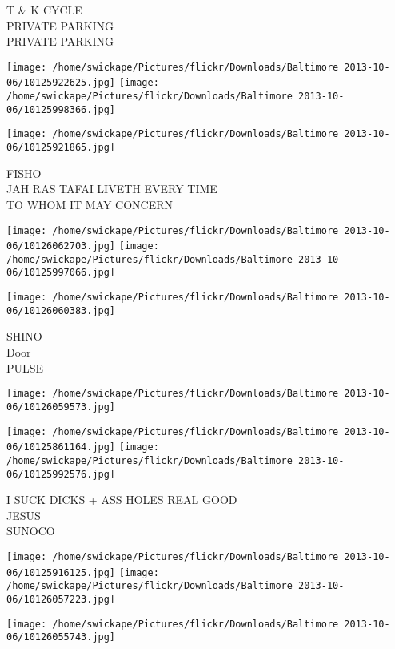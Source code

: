 \documentclass[10pt,letterpaper]{article}
\begin{document}
T \& K CYCLE\\
PRIVATE PARKING\\
PRIVATE PARKING
\pagebreak

\texttt{[image: /home/swickape/Pictures/flickr/Downloads/Baltimore 2013-10-06/10125922625.jpg]}
\texttt{[image: /home/swickape/Pictures/flickr/Downloads/Baltimore 2013-10-06/10125998366.jpg]}

\vspace{0.25in}
\texttt{[image: /home/swickape/Pictures/flickr/Downloads/Baltimore 2013-10-06/10125921865.jpg]}

FISHO\\
JAH RAS TAFAI LIVETH EVERY TIME\\
TO WHOM IT MAY CONCERN
\pagebreak

\texttt{[image: /home/swickape/Pictures/flickr/Downloads/Baltimore 2013-10-06/10126062703.jpg]}
\texttt{[image: /home/swickape/Pictures/flickr/Downloads/Baltimore 2013-10-06/10125997066.jpg]}

\vspace{0.25in}
\texttt{[image: /home/swickape/Pictures/flickr/Downloads/Baltimore 2013-10-06/10126060383.jpg]}

SHINO\\
Door\\
PULSE
\pagebreak

\texttt{[image: /home/swickape/Pictures/flickr/Downloads/Baltimore 2013-10-06/10126059573.jpg]}

\vspace{0.25in}
\texttt{[image: /home/swickape/Pictures/flickr/Downloads/Baltimore 2013-10-06/10125861164.jpg]}
\texttt{[image: /home/swickape/Pictures/flickr/Downloads/Baltimore 2013-10-06/10125992576.jpg]}

I SUCK DICKS + ASS HOLES REAL GOOD\\
JESUS\\
SUNOCO
\pagebreak

\texttt{[image: /home/swickape/Pictures/flickr/Downloads/Baltimore 2013-10-06/10125916125.jpg]}
\texttt{[image: /home/swickape/Pictures/flickr/Downloads/Baltimore 2013-10-06/10126057223.jpg]}

\vspace{0.25in}
\texttt{[image: /home/swickape/Pictures/flickr/Downloads/Baltimore 2013-10-06/10126055743.jpg]}
\end{document}
